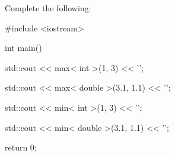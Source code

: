 Complete the following:



\begin{consolethree}[escapeinside=||]

#include <iostream>



int main()

{

    std::cout << max< int >(1, 3) << '\n';

    std::cout << max< double >(3.1, 1.1) << '\n';

    std::cout << min< int >(1, 3) << '\n';

    std::cout << min< double >(3.1, 1.1) << '\n';

    return 0;

}

\end{consolethree}

